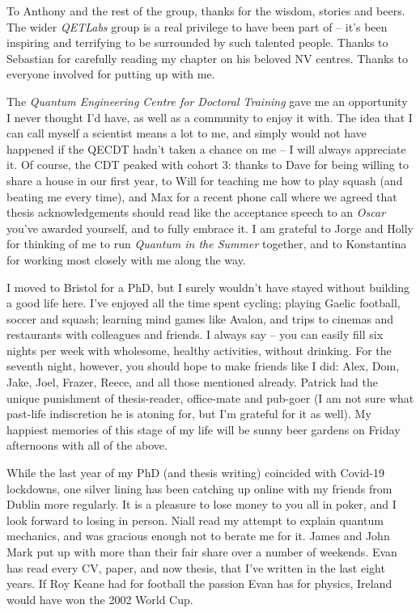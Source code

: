 To Anthony and the rest of the group,
    thanks for the wisdom, stories and beers.
The wider \emph{QETLabs} group is a real privilege to have been part of -- 
    it's been inspiring and terrifying to be surrounded by such talented people.
Thanks to Sebastian for carefully reading my chapter on his beloved NV centres.
Thanks to everyone involved for putting up with me. 
\par

The \emph{Quantum Engineering Centre for Doctoral Training} gave me an opportunity I 
    never thought I'd have, as well as a community to enjoy it with. 
The idea that I can call myself a scientist means a lot to me, 
    and simply would not have happened if the QECDT hadn't taken a chance on me -- 
    I will always appreciate it. 
Of course, the CDT peaked with cohort 3:
    thanks to Dave for being willing to share a house in our first year, 
    to Will for teaching me how to play squash (and beating me every time), 
    and Max for a recent phone call where we agreed that thesis acknowledgements should
    read like the acceptance speech to an \emph{Oscar} you've awarded yourself, and to fully embrace it. 
I am grateful to Jorge and Holly for thinking of me to run \emph{Quantum in the Summer} together,
    and to Konstantina for working most closely with me along the way.  
\par 

I moved to Bristol for a PhD, 
    but I surely wouldn't have stayed without building a good life here. 
I've enjoyed all the time spent cycling; playing Gaelic football, soccer and squash;
    learning mind games like Avalon, and trips to cinemas and restaurants with colleagues and friends. 
I always say -- you can easily fill six nights per week with wholesome, healthy activities, 
    without drinking. 
For the seventh night, however, you should hope to make friends like I did:
    Alex, Dom, Jake, Joel, Frazer, Reece, and all those mentioned already.
Patrick had the unique punishment of thesis-reader, office-mate and pub-goer 
    (I am not sure what past-life indiscretion he is atoning for, but I'm grateful for it as well). 
My happiest memories of this stage of my life will be sunny beer gardens on Friday afternoons with all of the above. 

While the last year of my PhD (and thesis writing) coincided with Covid-19 lockdowns, 
    one silver lining has been catching up online with my friends from Dublin more regularly. 
It is a pleasure to lose money to you all in poker, and I look forward to losing in person. 
Niall read my attempt to explain quantum mechanics, 
    and was gracious enough not to berate me for it. 
James and John Mark put up with more than their fair share over a number of weekends. 
Evan has read every CV, paper, and now thesis, that I've written in the last eight years. 
If Roy Keane had for football the passion Evan has for physics, 
    Ireland would have won the 2002 World Cup.
\par 

